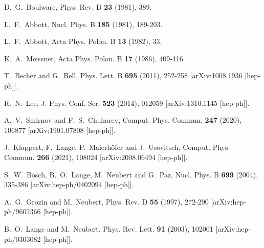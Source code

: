 \documentclass[12pt]{article}
\numberwithin{equation}{section}
\begin{document}
\begin{thebibliography}{99}
D.~G.~Boulware,
Phys. Rev. D \textbf{23} (1981), 389.

L.~F.~Abbott,
Nucl. Phys. B \textbf{185} (1981), 189-203.

L.~F.~Abbott,
Acta Phys. Polon. B \textbf{13} (1982), 33.

K.~A.~Meissner,
Acta Phys. Polon. B \textbf{17} (1986), 409-416.

T.~Becher and G.~Bell,
Phys. Lett. B \textbf{695} (2011), 252-258
[arXiv:1008.1936 [hep-ph]].

R.~N.~Lee,
J. Phys. Conf. Ser. \textbf{523} (2014), 012059
[arXiv:1310.1145 [hep-ph]].

A.~V.~Smirnov and F.~S.~Chuharev,
Comput. Phys. Commun. \textbf{247 } (2020), 106877
[arXiv:1901.07808 [hep-ph]].

J.~Klappert, F.~Lange, P.~Maierh\"ofer and J.~Usovitsch,
Comput. Phys. Commun. \textbf{266} (2021), 108024
[arXiv:2008.06494 [hep-ph]].

S.~W.~Bosch, B.~O.~Lange, M.~Neubert and G.~Paz,
Nucl. Phys. B \textbf{699} (2004), 335-386
[arXiv:hep-ph/0402094 [hep-ph]].

A.~G.~Grozin and M.~Neubert,
Phys. Rev. D \textbf{55} (1997), 272-290
[arXiv:hep-ph/9607366 [hep-ph]].

B.~O.~Lange and M.~Neubert,
Phys. Rev. Lett. \textbf{91} (2003), 102001
[arXiv:hep-ph/0303082 [hep-ph]].


\end{thebibliography}
\end{document}
